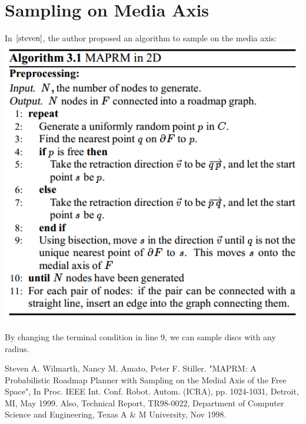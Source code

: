 \documentclass[12pt]{article}
\begin{document}
  
  \section{Sampling on Media Axis} 
  
  In $\cite{steven}$, the author proposed an algorithm to sample on the media axis:\\
  
  \includegraphics[scale=0.6]{./sampling2d/MAPRM.png}  
  
  By changing the terminal condition in line 9, we can sample discs with any radius. \\
    

        
  
  \begin{thebibliography}{1}

   Steven A. Wilmarth, Nancy M. Amato, Peter F. Stiller. "MAPRM: A Probabilistic Roadmap Planner with Sampling on the Medial Axis of the Free Space", In Proc. IEEE Int. Conf. Robot. Autom. (ICRA), pp. 1024-1031, Detroit, MI, May 1999. Also, Technical Report, TR98-0022, Department of Computer Science and Engineering, Texas A \& M University, Nov 1998.

  \end{thebibliography}
  
\end{document}
